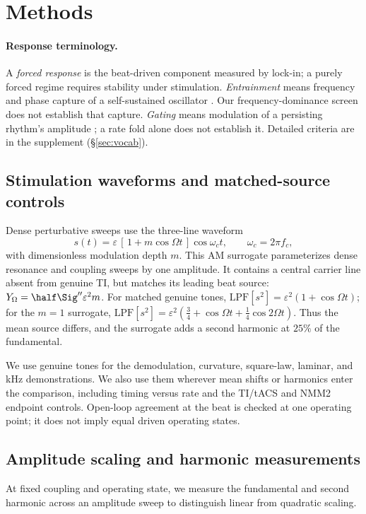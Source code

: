 \section{Methods}

\paragraph{Response terminology.}\label{sec:vocab-methods}
A \emph{forced response} is the beat-driven component measured by lock-in; a purely
forced regime requires stability under stimulation. \emph{Entrainment} means
frequency and phase capture of a self-sustained oscillator \cite{pikovsky2001}.
Our frequency-dominance screen does not establish that capture. \emph{Gating}
means modulation of a persisting rhythm's amplitude \cite{canolty2010,tort2010};
a rate fold alone does not establish it. Detailed criteria are in the supplement
(\S\ref{sec:vocab}).

\subsection{Stimulation waveforms and matched-source controls}\label{sec:waveforms}
Dense perturbative sweeps use the
three-line waveform
\begin{equation}
s(t)=\varepsilon\,[\,1+m\cos\Omega t\,]\cos\omega_c t,\qquad \omega_c=2\pi f_c ,
\label{eq:amsur}
\end{equation}
with dimensionless modulation depth $m$. This AM surrogate parameterizes dense resonance and coupling sweeps by one amplitude. It contains a central carrier line absent from genuine TI, but matches its leading beat source: $Y_\Omega=\half\Sig''\varepsilon^2m$. For matched genuine tones, $\mathrm{LPF}[s^2]=\varepsilon^2(1+\cos\Omega t)$; for the $m=1$ surrogate, $\mathrm{LPF}[s^2]=\varepsilon^2(\tfrac34+\cos\Omega t+\tfrac14\cos2\Omega t)$. Thus the mean source differs, and the surrogate adds a second harmonic at $25\%$ of the fundamental.

We use genuine tones for the demodulation, curvature, square-law, laminar, and kHz demonstrations. We also use them wherever mean shifts or harmonics enter the comparison, including timing versus rate and the TI/tACS and NMM2 endpoint controls. Open-loop agreement at the beat is checked at one operating point; it does not imply equal driven operating states.

\subsection{Amplitude scaling and harmonic measurements}\label{sec:transduction-methods}
At fixed coupling and operating state, we measure the fundamental and second
harmonic across an amplitude sweep to distinguish linear from quadratic scaling.

